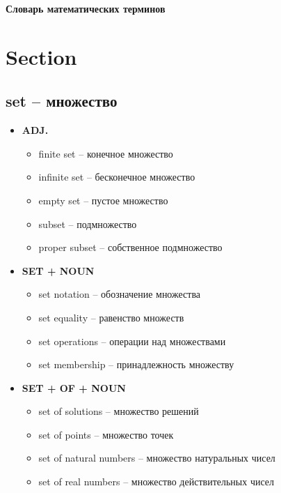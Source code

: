 \documentclass[a4paper, 10pt]{article}
\theoremstyle{definition}
\theoremstyle{plain}
\theoremstyle{remark}
\begin{document}
\begin{center}
    \textbf{{\LARGE Словарь математических терминов} }    
\end{center}

\section{Section}

\subsection{set – множество}

\begin{itemize}
    \item \textbf{ADJ.}
    \begin{itemize}
        \item finite set – конечное множество
        \item infinite set – бесконечное множество
        \item empty set – пустое множество
        \item subset – подмножество
        \item proper subset – собственное подмножество
    \end{itemize}
    
    \item \textbf{SET + NOUN}
    \begin{itemize}
        \item set notation – обозначение множества
        \item set equality – равенство множеств
        \item set operations – операции над множествами
        \item set membership – принадлежность множеству
    \end{itemize}
    
    \item \textbf{SET + OF + NOUN}
    \begin{itemize}
        \item set of solutions – множество решений
        \item set of points – множество точек
        \item set of natural numbers – множество натуральных чисел
        \item set of real numbers – множество действительных чисел
    \end{itemize}
    

\end{itemize}
\end{document}
